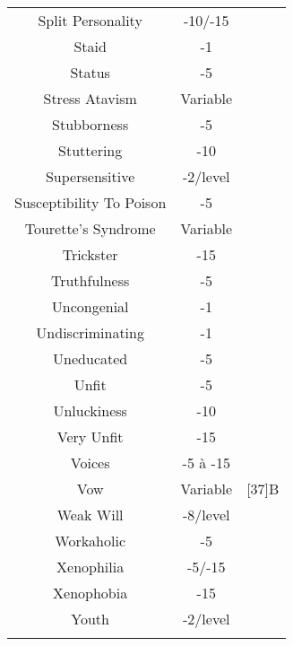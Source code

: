 \begin{center}
\begin{supertabular}{|c|c|c|}
Split Personality & -10/-15 & \cite[37]{B} \\
Staid & -1 & \cite[94]{CI} \\
Status & -5 & \cite[18]{B} \\
Stress Atavism & Variable & \cite[105]{CI} \\
Stubborness & -5 & \cite[37]{B} \\
Stuttering & -10 & \cite[29]{B} \\
Supersensitive & -2/level & \cite[99]{CI} \\
Susceptibility To Poison & -5 & \cite[84]{CI} \\
Tourette's Syndrome & Variable & \cite[85]{CI} \\
Trickster & -15 & \cite[94]{CI} \\
Truthfulness & -5 & \cite[37]{B} \\
Uncongenial & -1 & \cite[94]{CI} \\
Undiscriminating & -1 & \cite[94]{CI} \\
Uneducated & -5 & \cite[79]{CI} \\
Unfit & -5 & \cite[85]{CI} \\
Unluckiness & -10 & \cite[37]{B} \\
Very Unfit & -15 & \cite[85]{CI} \\
Voices & -5 à -15 & \cite[94]{CI} \\
Vow & Variable & [37]{B} \\
Weak Will & -8/level & \cite[37]{B} \\
Workaholic & -5 & \cite[95]{CI} \\
Xenophilia & -5/-15 & \cite[95]{CI} \\
Xenophobia & -15 & \cite[36]{B} \\
Youth & -2/level & \cite[29]{B} \\


\end{supertabular}
\end{center}

